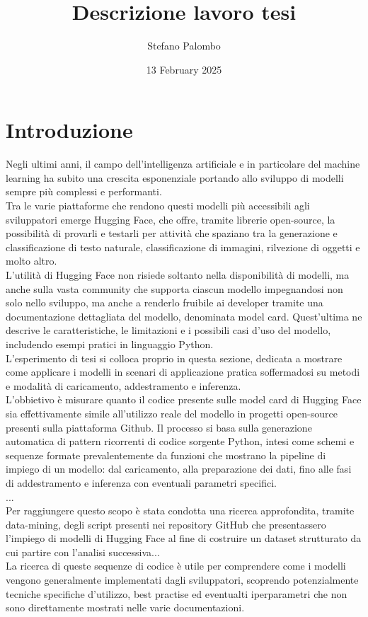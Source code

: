 \documentclass{article}
\title{Descrizione lavoro tesi}
\author{Stefano Palombo}
\date{13 February 2025}
\begin{document}
\maketitle

\section{Introduzione}
Negli ultimi anni, il campo dell'intelligenza artificiale e in particolare del machine learning ha subito una crescita esponenziale portando allo sviluppo di modelli sempre più complessi e performanti.\\
Tra le varie piattaforme che rendono questi modelli più accessibili agli sviluppatori emerge Hugging Face, che offre, tramite librerie open-source, la possibilità di provarli e testarli per attività che spaziano tra la generazione e classificazione di testo naturale, classificazione di immagini, rilvezione di oggetti e molto altro.\\
L'utilità di Hugging Face non risiede soltanto nella disponibilità di modelli, ma anche sulla vasta community che supporta ciascun modello impegnandosi non solo nello sviluppo, ma anche a renderlo fruibile ai developer tramite una documentazione dettagliata del modello, denominata model card. Quest'ultima ne descrive le caratteristiche, le limitazioni e i possibili casi d'uso del modello, includendo esempi pratici in linguaggio Python.\\
L'esperimento di tesi si colloca proprio in questa sezione, dedicata a mostrare come applicare i modelli in scenari di applicazione pratica soffermadosi su metodi e modalità di caricamento, addestramento e inferenza.\\
L'obbietivo è misurare quanto il codice presente sulle model card di Hugging Face sia effettivamente simile all'utilizzo reale del modello in progetti open-source presenti sulla piattaforma Github. Il processo si basa sulla generazione automatica di pattern ricorrenti di codice sorgente Python, intesi come schemi e sequenze formate prevalentemente da funzioni che mostrano la pipeline di impiego di un modello: dal caricamento, alla preparazione dei dati, fino alle fasi di addestramento e inferenza con eventuali parametri specifici.\\
...\\
Per raggiungere questo scopo è stata condotta una ricerca approfondita, tramite data-mining, degli script presenti nei repository GitHub che presentassero l'impiego di modelli di Hugging Face al fine di costruire un dataset strutturato da cui partire con l'analisi successiva...\\
La ricerca di queste sequenze di codice è utile per comprendere come i modelli vengono generalmente implementati dagli sviluppatori, scoprendo potenzialmente tecniche specifiche d'utilizzo, best practise ed eventualti iperparametri che non sono direttamente mostrati nelle varie documentazioni.
\end{document}
